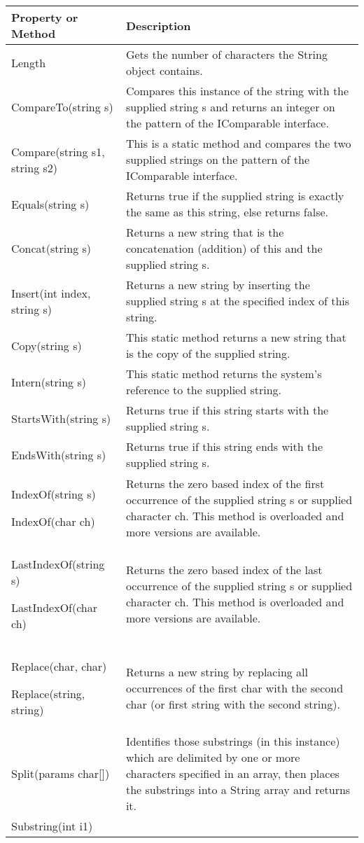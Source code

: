\begin{center}
    \begin{tabular}{ | m{5em} | m{10cm} | } 
    \hline
    Property or Method & Description \\
    \hline
    Length & Gets the number of characters the String object contains.\\
    CompareTo(string s) & Compares this instance of the string with the supplied string s and returns an
    integer on the pattern of the IComparable interface.\\
    Compare(string s1, string s2) & This is a static method and compares the two supplied strings on the pattern of
    the IComparable interface.\\
    Equals(string s) & Returns true if the supplied string is exactly the same as this string, else returns
    false.\\
    Concat(string s) & Returns a new string that is the concatenation (addition) of this and the supplied
    string s.\\
    Insert(int index, string s) & Returns a new string by inserting the supplied string s at the specified index of
    this string.\\
    Copy(string s) & This static method returns a new string that is the copy of the supplied string.\\
    Intern(string s) & This static method returns the system’s reference to the supplied string.\\
    StartsWith(string s) & Returns true if this string starts with the supplied string s.\\
    EndsWith(string s) & Returns true if this string ends with the supplied string s.\\
    IndexOf(string s)

    IndexOf(char ch)&
    Returns the zero based index of the first occurrence of the supplied string s or
    supplied character ch. This method is overloaded and more versions are
    available.\\
    LastIndexOf(string s)

    LastIndexOf(char ch)&
    Returns the zero based index of the last occurrence of the supplied string s or
    supplied character ch. This method is overloaded and more versions are
    available.\\
    Replace(char, char)

    Replace(string, string) &
    Returns a new string by replacing all occurrences of the first char with the
    second char (or first string with the second string).\\
    Split(params char[]) & Identifies those substrings (in this instance) which are delimited by one or more
    characters specified in an array, then places the substrings into a String array and
    returns it.\\
    Substring(int i1)


\end{tabular}
\end{center}
